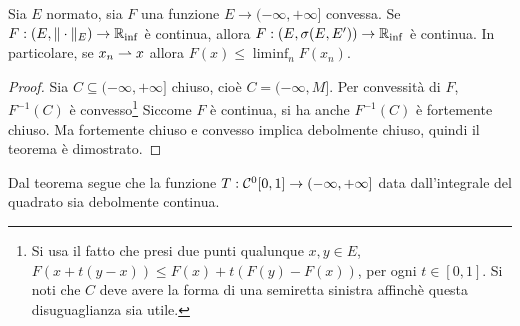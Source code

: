 \begin{theorem}
	Sia $E$ normato, sia $F$ una funzione $E \to (-\infty, +\infty]$ convessa.
	Se $F : (E, \|\cdot\|_E) \to \mathbb{R}_{\inf}$ è continua, allora $F : (E, \sigma(E,E')) \to \mathbb{R}_{\inf}$ è continua.
	In particolare, se $x_n \rightharpoonup x$ allora $F(x) \leq \liminf_n F(x_n)$.
\end{theorem}
\begin{proof}
	Sia $C \subseteq (-\infty, + \infty]$ chiuso, cioè $C=(-\infty, M]$. Per convessità di $F$, $F^{-1}(C)$ è convesso\footnote{Si usa il fatto che presi due punti qualunque $x,y \in E$, $F(x+t(y-x)) \leq F(x) + t(F(y) - F(x))$, per ogni $t \in [0,1]$. Si noti che $C$ deve avere la forma di una semiretta sinistra affinchè questa disuguaglianza sia utile.}
	Siccome $F$ è continua, si ha anche $F^{-1}(C)$ è fortemente chiuso. Ma fortemente chiuso e convesso implica debolmente chiuso, quindi il teorema è dimostrato.
\end{proof}

\begin{remark}
	Dal teorema segue che la funzione $T: \mathcal{C}^0[0,1] \to (-\infty,+\infty]$ data dall'integrale del quadrato sia debolmente continua.
\end{remark}

